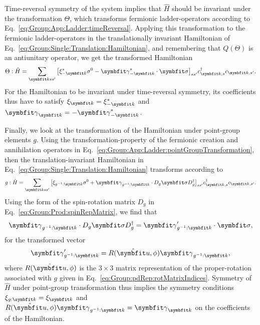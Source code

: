 Time-reversal symmetry of the system implies that $\hat{H}$ should be invariant under the transformation $\Theta$, which transforms fermionic ladder-operators
according to Eq.~\eqref{eq:Group:App:Ladder:timeReversal}. Applying this transformation to the fermionic ladder-operators in the translationally invariant Hamiltonian of
Eq.~\eqref{eq:Group:Single:Translation:Hamiltonian}, and remembering that $Q(\Theta)$ is an antiunitary operator, we get the transformed Hamiltonian
\begin{equation}
    \label{eq:Group:Single:TRS:transformedHamiltonian}
    \Theta:\hat{H} = \sum_{\v{k}ss'}\big[\xi_{-\v{k}}^\ast\sigma^0 - \v{\gamma}_{-\v{k}}^\ast\cdot\v{\sigma}\big]_{ss'}c^\dagger_{\v{k},s}c_{\v{k},s'}.
\end{equation}
For the Hamiltonian to be invariant under time-reversal symmetry, its coefficients thus have to satisfy $\xi_\v{k} = \xi_{-\v{k}}^\ast$ and
$\v{\gamma}_\v{k} = -\v{\gamma}_{-\v{k}}^\ast$.

Finally, we look at the transformation of the Hamiltonian under point-group elements $g$. Using the transformation-property of the fermionic creation and
annihilation operators in Eq.~\eqref{eq:Group:App:Ladder:pointGroupTransformation}, then the translation-invariant Hamiltonian in
Eq.~\eqref{eq:Group:Single:Translation:Hamiltonian} transforms according to
\begin{equation}
    \label{eq:Group:Single:Point:transformedHamiltonian}
    g:\hat{H} = \sum_{\v{k}ss'}\big[\xi_{g^{-1}:\v{k}}\sigma^0 + \v{\gamma}_{g^{-1}:\v{k}}\cdot D_g\v{\sigma}D_g^\dagger\big]_{ss'}c^\dagger_{\v{k},s}c_{\v{k},s'}.
\end{equation}
Using the form of the spin-rotation matrix $D_g$ in Eq.~\eqref{eq:Group:Prod:spinRepMatrix}, we find that
\begin{equation}
    \label{eq:Group:Single:Point:sigmaTransform}
    \v{\gamma}_{g^{-1}:\v{k}}\cdot D_g\v{\sigma}D_g^\dagger = \v{\gamma}'_{g^{-1}:\v{k}}\cdot\v{\sigma},
\end{equation}
for the transformed vector
\begin{equation}
    \label{eq:Group:Single:point:transformedVector}
    \v{\gamma}'_{g^{-1}:\v{k}} = R(\hat{\v{u}},\phi)\v{\gamma}_{g^{-1}:\v{k}},
\end{equation}
where $R(\hat{\v{u}},\phi)$ is the $3\times3$ matrix representation of the proper-rotation associated with $g$ given in
Eq.~\eqref{eq:Group:pdRep:rotMatrixIndices}. Symmetry of $\hat{H}$ under point-group transformation thus implies the symmetry conditions $\xi_{g:\v{k}} = \xi_{\v{k}}$
and $R(\hat{\v{u}},\phi)\v{\gamma}_{g^{-1}:\v{k}} = \v{\gamma}_\v{k}$ on the coefficients of the Hamiltonian.


